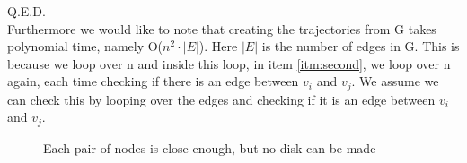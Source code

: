\documentclass[a4paper,11pt]{article}
\begin{document}
Q.E.D.\\

Furthermore we would like to note that creating the trajectories from G takes polynomial time, namely O($n^2\cdot|E|$). Here $|E|$ is the number of edges in G. This is because we loop over n and inside this loop, in item \ref{itm:second}, we loop over n again, each time checking if there is an edge between $v_i$ and $v_j$. We assume we can check this by looping over the edges and checking if it is an edge between $v_i$ and $v_j$.

\begin{figure}[H]
	\centering
	\def\svgwidth{0.5\textwidth}
	
	\caption{Each pair of nodes is close enough, but no disk can be made}
	\label{fig:nodisk}
\end{figure}
\end{document}

